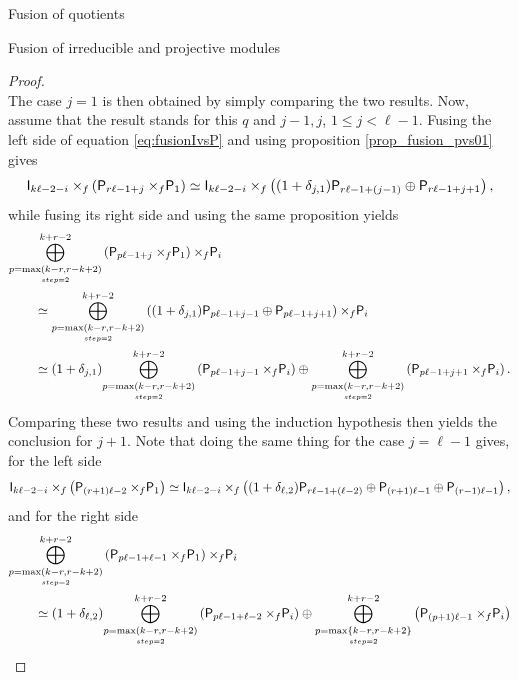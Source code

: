 \documentclass[reqno]{amsart}
\newcommand{\dl}[1]{\mathsf I_{#1}}
\newcommand{\dP}[1]{\mathsf P_{#1}}
\newcommand{\xf}{\times\hspace{-0.27em}_f}
\newcommand{\lc}{\ell}
\begin{document}
\begin{section}{Fusion of quotients}
\begin{subsection}{Fusion of irreducible and projective modules}
\begin{proof}
\begin{equation*}
\end{equation*}
The case $j=1$ is then obtained by simply comparing the two results. Now, assume that the result stands for this $q$ and $j-1,j$, $1 \leq j < \lc -1$. Fusing the left side of equation \eqref{eq:fusionIvsP} and using proposition \ref{prop_fusion_pvs01} gives
\begin{equation*}
	\dl{k \lc -2- i} \xf \left(\dP{r \lc -1 +j} \xf \dP{1} \right) \simeq \dl{k \lc -2 -i} \xf \left((1+\delta_{j,1})\dP{r \lc -1 + (j-1)}  \oplus \dP{r \lc -1 +j+1} \right),
\end{equation*}
while fusing its right side and using the same proposition yields
\begin{align*}
	&\overset{k+r-2}{\underset{\underset{step=2}{p = \max\left(k-r, r-k +2 \right)}}{\bigoplus}}\left( \dP{p \lc -1 +j} \xf \dP{1}\right) \xf \dP{i} \notag\\
	&\qquad \simeq \overset{k+r-2}{\underset{\underset{step=2}{p = \max\left(k-r, r-k +2 \right)}}{\bigoplus}}\left( (1 + \delta_{j,1})\dP{p \lc -1 +j-1} \oplus \dP{p \lc -1 +j+1}\right) \xf \dP{i} \notag\\
	& \qquad \simeq (1 + \delta_{j,1})\overset{k+r-2}{\underset{\underset{step=2}{p = \max\left(k-r, r-k +2 \right)}}{\bigoplus}}\left( \dP{p \lc -1 +j-1} \xf \dP{i}\right)  \oplus \overset{k+r-2}{\underset{\underset{step=2}{p = \max\left(k-r, r-k +2 \right)}}{\bigoplus}}\left( \dP{p \lc -1 +j+1} \xf \dP{i}\right) .
\end{align*}
Comparing these two results and using the induction hypothesis then yields the conclusion for $j+1$. Note that doing the same thing for the case $j =\lc -1$ gives, for the left side
\begin{equation*}
	\dl{k \lc -2- i} \xf \left(\dP{(r+1) \lc -2} \xf \dP{1} \right) \simeq \dl{k \lc -2 -i} \xf \left((1+\delta_{\lc, 2})\dP{r \lc -1 + (\lc -2)}  \oplus \dP{(r+1) \lc -1 } \oplus \dP{(r-1)\lc -1} \right),
\end{equation*}
and for the right side
\begin{align*}
	&\overset{k+r-2}{\underset{\underset{step=2}{p = \max\left(k-r, r-k +2 \right)}}{\bigoplus}}\left( \dP{p \lc -1 +\lc - 1} \xf \dP{1}\right) \xf \dP{i} \\
	&\qquad \simeq (1 + \delta_{\ell,2})\overset{k+r-2}{\underset{\underset{step=2}{p = \max\left(k-r, r-k +2 \right)}}{\bigoplus}}\left( \dP{p \lc -1 +\ell -2} \xf \dP{i}\right) \oplus \overset{k+r-2}{\underset{\underset{step=2}{p = \max\left\{k-r, r-k +2 \right\}}}{\bigoplus}}\left( \dP{(p+1) \lc -1} \xf \dP{i}\right) \\

\end{align*}
\end{proof}
\end{subsection}
\end{section}
\end{document}
